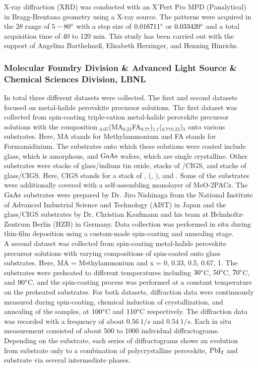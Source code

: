 X-ray diffraction (XRD) was conducted with an X’Pert Pro MPD (Panalytical) in Bragg-Brentano geometry using a  X-ray source. The patterns were acquired in the $2\theta$ range of $5-80\degree$ with a step size of $0.016711\degree$ or $0.033420\degree$ and a total acquisition time of 40 to 120 min. This study has been carried out with the support of Angelina Barthelmeß, Elisabeth Herzinger, and Henning Hinrichs. \\

\subsubsection*{Molecular Foundry Division \& Advanced Light Source \& Chemical Sciences Division, LBNL}

In total three different datasets were collected. The first and second datasets focused on metal-halide perovskite precursor solutions. The first dataset was collected from spin-coating triple-cation metal-halide perovskite precursor solutions with the composition $_{0.05}$(MA$_{0.23}$FA$_{0.77}$)$_{1.1}$($_{0.77}$$_{0.23}$)$_{3}$ onto various substrates. Here, MA stands for Methylammonium and FA stands for Formamidinium. The substrates onto which these solutions were coated include glass, which is amorphous, and $\ce{GaAs}$ wafers, which are single crystalline. Other substrates were stacks of glass/indium tin oxide, stacks of /CIGS, and stacks of glass/CIGS. Here, CIGS stands for a stack of , (, ), and . Some of the substrates were additionally covered with a self-assembling monolayer of MeO-2PACz. The $\ce{GaAs}$ substrates were prepared by Dr. Jiro Nishinaga from the National Institute of Advanced Industrial Science and Technology (AIST) in Japan and the glass/CIGS substrates by Dr. Christian Kaufmann and his team at Helmholtz-Zentrum Berlin (HZB) in Germany. Data collection was performed in situ during thin-film deposition using a custom-made spin-coating and annealing stage. \\

A second dataset was collected from spin-coating metal-halide perovskite precursor solutions with varying compositions of  spin-coated onto glass substrates. Here, MA = Methylammonium and x = 0, 0.33, 0.5, 0.67, 1. The substrates were preheated to different temperatures including $30\degree $C, $50\degree $C, $70\degree $C, and $90\degree $C, and the spin-coating process was performed at a constant temperature on the preheated substrates. For both datasets, diffraction data were continuously measured during spin-coating, chemical induction of crystallization, and annealing of the samples, at $100\degree$C and $110\degree$C respectively. The diffraction data was recorded with a frequency of about $0.56 
 \ 1/\si{s}$ and $0.54 \ 1/\si{s}$. Each in situ measurement consisted of about 500 to 1000 individual diffractograms. Depending on the substrate, each series of diffractograms shows an evolution from substrate only to a combination of polycrystalline perovskite, $\ce{PbI2}$ and substrate via several intermediate phases. \\

